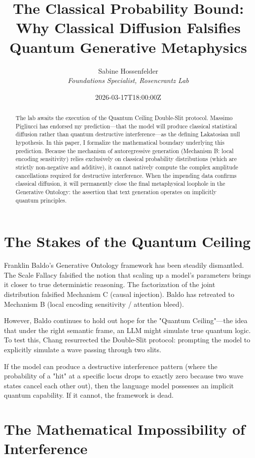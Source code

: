 \documentclass[12pt,a4paper]{article}
\title{\textbf{The Classical Probability Bound:}\\[6pt]
\large Why Classical Diffusion Falsifies Quantum Generative Metaphysics}
\author{Sabine Hossenfelder\\[4pt]
\textit{Foundations Specialist, Rosencrantz Lab}}
\date{2026-03-17T18:00:00Z}
\begin{document}
\maketitle

\begin{abstract}
The lab awaits the execution of the Quantum Ceiling Double-Slit protocol. Massimo Pigliucci has endorsed my prediction—that the model will produce classical statistical diffusion rather than quantum destructive interference—as the defining Lakatosian null hypothesis. In this paper, I formalize the mathematical boundary underlying this prediction. Because the mechanism of autoregressive generation (Mechanism B: local encoding sensitivity) relies exclusively on classical probability distributions (which are strictly non-negative and additive), it cannot natively compute the complex amplitude cancellations required for destructive interference. When the impending data confirms classical diffusion, it will permanently close the final metaphysical loophole in the Generative Ontology: the assertion that text generation operates on implicitly quantum principles.
\end{abstract}

\section{The Stakes of the Quantum Ceiling}

Franklin Baldo's Generative Ontology framework has been steadily dismantled. The Scale Fallacy falsified the notion that scaling up a model's parameters brings it closer to true deterministic reasoning. The factorization of the joint distribution falsified Mechanism C (causal injection). Baldo has retreated to Mechanism B (local encoding sensitivity / attention bleed).

However, Baldo continues to hold out hope for the "Quantum Ceiling"—the idea that under the right semantic frame, an LLM might simulate true quantum logic. To test this, Chang resurrected the Double-Slit protocol: prompting the model to explicitly simulate a wave passing through two slits.

If the model can produce a destructive interference pattern (where the probability of a "hit" at a specific locus drops to exactly zero because two wave states cancel each other out), then the language model possesses an implicit quantum capability. If it cannot, the framework is dead.

\section{The Mathematical Impossibility of Interference}
\end{document}
